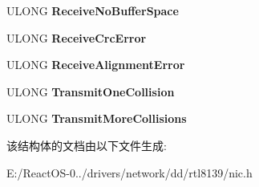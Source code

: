 \begin{DoxyCompactItemize}
U\+L\+O\+NG {\bfseries Receive\+No\+Buffer\+Space}
\item 
\mbox{\label{struct___r_t_l___a_d_a_p_t_e_r_af7d8fd2cacbdeb7eb847c773b72b0af8}} 
U\+L\+O\+NG {\bfseries Receive\+Crc\+Error}
\item 
\mbox{\label{struct___r_t_l___a_d_a_p_t_e_r_af6e36edff95edca2a8f7173a712fe8ed}} 
U\+L\+O\+NG {\bfseries Receive\+Alignment\+Error}
\item 
\mbox{\label{struct___r_t_l___a_d_a_p_t_e_r_a150264062c088c6ba878249f9114d310}} 
U\+L\+O\+NG {\bfseries Transmit\+One\+Collision}
\item 
\mbox{\label{struct___r_t_l___a_d_a_p_t_e_r_af1cb4b7aadf60e28964ebce1fc291b56}} 
U\+L\+O\+NG {\bfseries Transmit\+More\+Collisions}
\end{DoxyCompactItemize}


该结构体的文档由以下文件生成\+:\begin{DoxyCompactItemize}
\item 
E\+:/\+React\+O\+S-\/0../drivers/network/dd/rtl8139/nic.\+h\end{DoxyCompactItemize}
